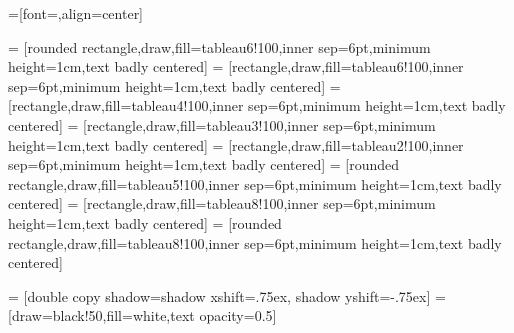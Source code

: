 



=[font=\sffamily,align=center]

 = [rounded rectangle,draw,fill=tableau6!100,inner sep=6pt,minimum height=1cm,text badly centered]
 = [rectangle,draw,fill=tableau6!100,inner sep=6pt,minimum height=1cm,text badly centered]
 = [rectangle,draw,fill=tableau4!100,inner sep=6pt,minimum height=1cm,text badly centered]
 = [rectangle,draw,fill=tableau3!100,inner sep=6pt,minimum height=1cm,text badly centered]
 = [rectangle,draw,fill=tableau2!100,inner sep=6pt,minimum height=1cm,text badly centered]
 = [rounded rectangle,draw,fill=tableau5!100,inner sep=6pt,minimum height=1cm,text badly centered]
 = [rectangle,draw,fill=tableau8!100,inner sep=6pt,minimum height=1cm,text badly centered]
 = [rounded rectangle,draw,fill=tableau8!100,inner sep=6pt,minimum height=1cm,text badly centered]


 = [double copy shadow={shadow xshift=.75ex, shadow yshift=-.75ex}]
 = [draw=black!50,fill=white,text opacity=0.5]

